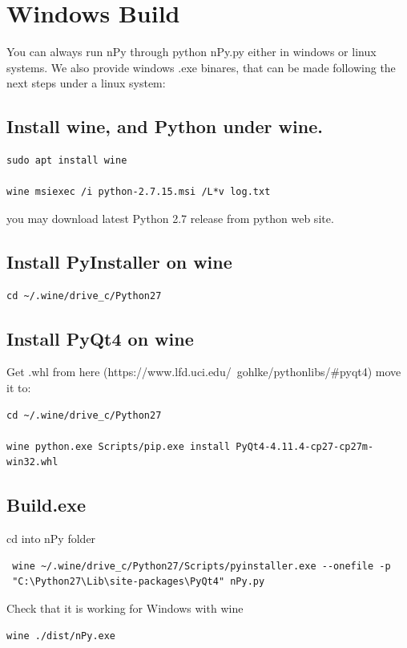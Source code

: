 \documentclass[a4paper,10pt]{article}
\begin{document}
\section{Windows Build}

You can always run nPy through python nPy.py either in windows or linux systems. We also provide windows .exe binares, that can be made following the next steps under a linux system:

\subsection{Install wine, and Python under wine.}
\begin{verbatim}
sudo apt install wine

wine msiexec /i python-2.7.15.msi /L*v log.txt
\end{verbatim}

\noindent you may download latest Python 2.7 release from python web site.

\subsection{Install PyInstaller on wine}
\begin{verbatim}
cd ~/.wine/drive_c/Python27 
\end{verbatim}

\subsection{Install PyQt4 on wine}

\noindent Get .whl from here (https://www.lfd.uci.edu/~gohlke/pythonlibs/\#pyqt4) move it to: 
\begin{verbatim}
cd ~/.wine/drive_c/Python27

wine python.exe Scripts/pip.exe install PyQt4-4.11.4-cp27-cp27m-win32.whl
\end{verbatim}

\subsection{Build.exe}
\noindent cd into nPy folder 

\begin{verbatim}
 wine ~/.wine/drive_c/Python27/Scripts/pyinstaller.exe --onefile -p 
 "C:\Python27\Lib\site-packages\PyQt4" nPy.py
\end{verbatim}

\noindent Check that it is working for Windows with wine
\begin{verbatim}
wine ./dist/nPy.exe
\end{verbatim}
\end{document}
